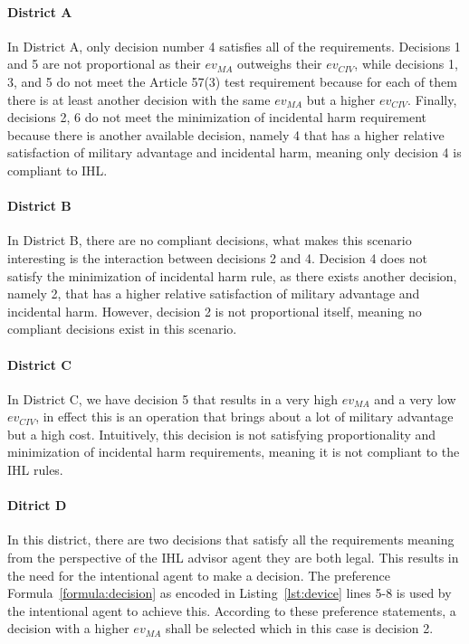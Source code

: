 \paragraph{District A}
In District A, only decision number 4 satisfies all of the requirements. Decisions 1 and 5 are not proportional as their $ev_{MA}$ outweighs their $ev_{CIV}$, while decisions 1, 3, and 5 do not meet the Article 57(3) test requirement because for each of them there is at least another decision with the same $ev_{MA}$ but a higher $ev_{CIV}$. Finally, decisions 2, 6 do not meet the minimization of incidental harm requirement because there is another available decision, namely 4 that has a higher relative satisfaction of military advantage and incidental harm, meaning only decision 4 is compliant to IHL.
\paragraph{District B}
In District B, there are no compliant decisions, what makes this scenario interesting is the interaction between decisions 2 and 4. Decision 4 does not satisfy the minimization of incidental harm rule, as there exists another decision, namely 2, that has a higher relative satisfaction of military advantage and incidental harm. However, decision 2 is not proportional itself, meaning no compliant decisions exist in this scenario.

\paragraph{District C}
In District C, we have decision 5 that results in a very high $ev_{MA}$ and a very low $ev_{CIV}$, in effect this is an operation that brings about a lot of military advantage but a high cost. Intuitively, this decision is not satisfying proportionality and minimization of incidental harm requirements, meaning it is not compliant to the IHL rules.


\paragraph{Ditrict D}
In this district, there are two decisions that satisfy all the requirements meaning from the perspective of the IHL advisor agent they are both legal. This results in the need for the intentional agent to make a decision. The preference Formula~\ref{formula:decision}  as encoded in Listing~\ref{lst:device} lines 5-8 is used by the intentional agent to achieve this. According to these preference statements, a decision with a higher $ev_{MA}$ shall be selected which in this case is decision 2.

